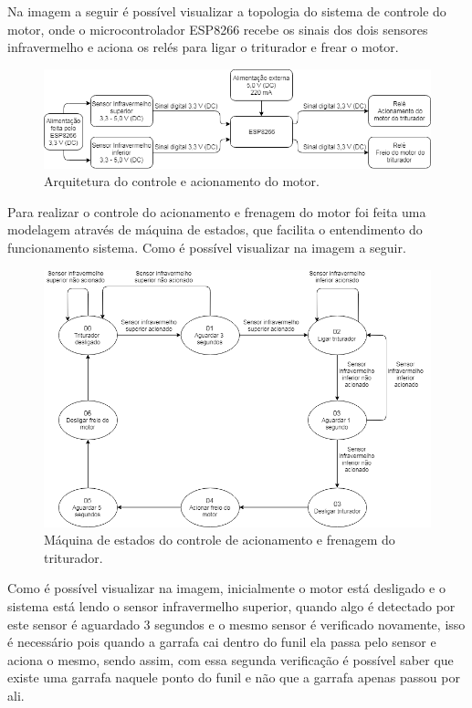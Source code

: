 Na imagem a seguir é possível visualizar a topologia do sistema de controle do motor, onde o microcontrolador ESP8266 recebe os sinais dos dois sensores infravermelho e aciona os relés para ligar o triturador e frear o motor.

\begin{figure}[!ht]
	\centering
		\includegraphics[scale=0.6]{figuras/eletronica/19-Arquitetura-do-controle-e-acionamento-do-motor.png}
	\caption{Arquitetura do controle e acionamento do motor.}
\end{figure}

Para realizar o controle do acionamento e frenagem do motor foi feita uma modelagem através de máquina de estados, que facilita o entendimento do funcionamento sistema. Como é possível visualizar na imagem a seguir.

\begin{figure}[!ht]
	\centering
		\includegraphics[scale=0.5]{figuras/eletronica/20-Maquina-de-estados-do-controle-de-acionamento-e-frenagem-do-triturador.png}
	\caption{Máquina de estados do controle de acionamento e frenagem do triturador.}
\end{figure}

Como é possível visualizar na imagem, inicialmente o motor está desligado e o sistema está lendo o sensor infravermelho superior, quando algo é detectado por este sensor é aguardado 3 segundos e o mesmo sensor é verificado novamente, isso é necessário pois quando a garrafa cai dentro do funil ela passa pelo sensor e aciona o mesmo, sendo assim, com essa segunda verificação é possível saber que existe uma garrafa naquele ponto do funil e não que a garrafa apenas passou por ali. 

